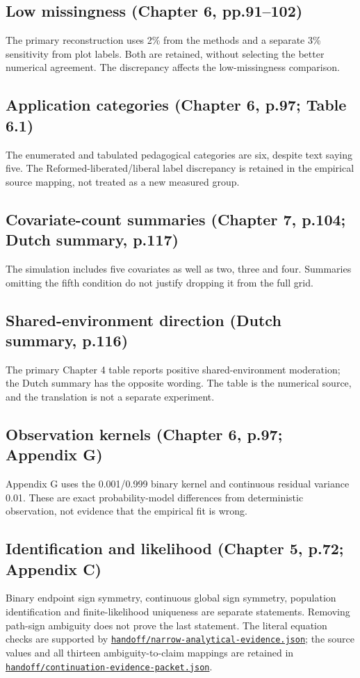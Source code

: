 \documentclass[11pt]{article}
\begin{document}
\subsection{Low missingness (Chapter 6, pp.91--102)}
The primary reconstruction uses 2\% from the methods and a separate 3\% sensitivity from plot labels. Both are retained, without selecting the better numerical agreement. The discrepancy affects the low-missingness comparison.
\subsection{Application categories (Chapter 6, p.97; Table 6.1)}
The enumerated and tabulated pedagogical categories are six, despite text saying five. The Reformed-liberated/liberal label discrepancy is retained in the empirical source mapping, not treated as a new measured group.
\subsection{Covariate-count summaries (Chapter 7, p.104; Dutch summary, p.117)}
The simulation includes five covariates as well as two, three and four. Summaries omitting the fifth condition do not justify dropping it from the full grid.
\subsection{Shared-environment direction (Dutch summary, p.116)}
The primary Chapter 4 table reports positive shared-environment moderation; the Dutch summary has the opposite wording. The table is the numerical source, and the translation is not a separate experiment.
\subsection{Observation kernels (Chapter 6, p.97; Appendix G)}
Appendix G uses the 0.001/0.999 binary kernel and continuous residual variance 0.01. These are exact probability-model differences from deterministic observation, not evidence that the empirical fit is wrong.
\subsection{Identification and likelihood (Chapter 5, p.72; Appendix C)}
Binary endpoint sign symmetry, continuous global sign symmetry, population identification and finite-likelihood uniqueness are separate statements. Removing path-sign ambiguity does not prove the last statement.
The literal equation checks are supported by \href{https://github.com/alectionary/vibe-math/blob/master/formalization/schwabe-psychometric-genetics/handoff/narrow-analytical-evidence.json}{\nolinkurl{handoff/narrow-analytical-evidence.json}}; the source values and all thirteen ambiguity-to-claim mappings are retained in \href{https://github.com/alectionary/vibe-math/blob/master/formalization/schwabe-psychometric-genetics/handoff/continuation-evidence-packet.json}{\nolinkurl{handoff/continuation-evidence-packet.json}}.
\end{document}
